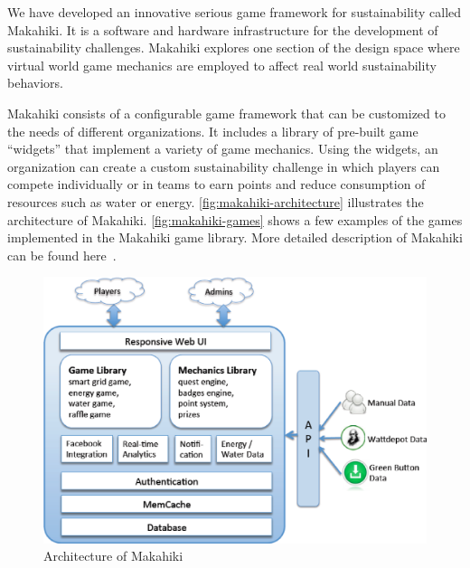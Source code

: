 \documentclass{sigchi}
\begin{document}
We have developed an innovative serious game framework for sustainability
called Makahiki. It is a software and hardware infrastructure for the development of
sustainability challenges. Makahiki explores one section of the design
space where virtual world game mechanics are employed to affect real
world sustainability behaviors.

Makahiki consists of a configurable game framework that can be customized
to the needs of different organizations. It includes a library of
pre-built game ``widgets'' that implement a variety of game mechanics.
Using the widgets, an organization can create a custom sustainability
challenge in which players can compete individually or in teams to
earn points and reduce consumption of resources such as water or energy.
\autoref{fig:makahiki-architecture} illustrates the architecture of
Makahiki. \autoref{fig:makahiki-games} shows a few examples of the
games implemented in the Makahiki game library. More detailed
description of Makahiki can be found here~\cite{csdl2-12-06}.

\begin{figure}[ht!]
  \center
  \includegraphics[width=\columnwidth]{makahiki-system-architecture}
  \caption{Architecture of Makahiki}
  \label{fig:makahiki-architecture}
\end{figure}
\end{document}
